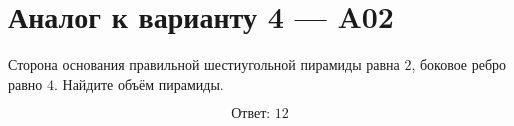 \documentclass[12pt,a4paper]{article}
\begin{document}
\section*{Аналог к варианту 4 — A02}

Сторона основания правильной шестиугольной пирамиды равна \(2\), боковое ребро равно \(4\). Найдите объём пирамиды.

\begin{center}
\end{center}

\[
\boxed{\text{Ответ: }12}
\]
\end{document}
